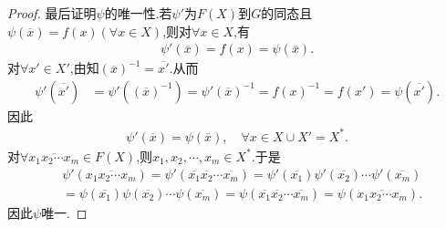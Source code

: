 \documentclass[../../main.tex]{subfiles}%
\begin{document}
\begin{proof}
最后证明$\psi$的唯一性.若$\psi'$为$F(X)$到$G$的同态且$\psi(\overline{x})=f(x)(\forall x\in X)$,则对$\forall x\in X$,有
\begin{align*}
\psi' \left( \overline{x} \right) =f\left( x \right) =\psi \left( \overline{x} \right) .
\end{align*}
对$\forall x'\in X'$,由知$\left( \overline{x} \right) ^{-1}=\overline{x'}.$从而
\begin{align*}
\psi' \left( \overline{x'} \right) &=\psi' \left( \left( \overline{x} \right) ^{-1} \right) =\psi' \left( \overline{x} \right) ^{-1}=f\left( x \right) ^{-1}=f\left( x' \right) =\psi \left( \overline{x'} \right) .
\end{align*}
因此
\begin{align*}
\psi' \left( \overline{x} \right) =\psi \left( \overline{x} \right) ,\quad \forall x\in X\cup X' =X^*.
\end{align*}
对$\forall \overline{x_1x_2\cdots x_m}\in F\left( X \right) $,则$x_1,x_2,\cdots ,x_m\in X^*.$于是
\begin{align*}
&\psi' \left( \overline{x_1x_2\cdots x_m} \right) =\psi' \left( \overline{x_1}\overline{x_2}\cdots \overline{x_m} \right) =\psi' \left( \overline{x_1} \right) \psi' \left( \overline{x_2} \right) \cdots \psi' \left( \overline{x_m} \right) \\
&=\psi \left( \overline{x_1} \right) \psi \left( \overline{x_2} \right) \cdots \psi \left( \overline{x_m} \right) =\psi \left( \overline{x_1}\overline{x_2}\cdots \overline{x_m} \right) =\psi \left( \overline{x_1x_2\cdots x_m} \right) .
\end{align*}
因此$\psi$唯一.

\end{proof}
\end{document}

